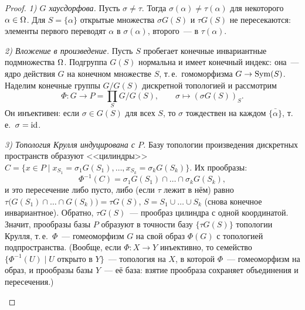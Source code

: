 \begin{proof}
\emph{1) $G$ хаусдорфова.} Пусть $\sigma\ne\tau$. Тогда $\sigma(\alpha)\ne\tau(\alpha)$ для некоторого $\alpha\in\Omega$. Для
$S=\{\alpha\}$ открытые множества $\sigma G(S)$ и $\tau G(S)$ не пересекаются: элементы первого переводят $\alpha$ в
$\sigma(\alpha)$, второго~--- в $\tau(\alpha)$.

\emph{2) Вложение в произведение.} Пусть $S$ пробегает конечные инвариантные подмножества $\Omega$. Подгруппа $G(S)$
нормальна и имеет конечный индекс: она~--- ядро действия $G$ на конечном множестве $S$, т.\,е.\ гомоморфизма
$G\to\operatorname{Sym}(S)$. Наделим конечные группы $G/G(S)$ дискретной топологией и рассмотрим
\[
\Phi\colon G\to P=\prod_S G/G(S),\qquad \sigma\mapsto(\sigma G(S))_S.
\]
Он инъективен: если $\sigma\in G(S)$ для всех $S$, то $\sigma$ тождествен на каждом $\bar{\{\alpha\}}$, т.\,е.\
$\sigma=\operatorname{id}$.

\emph{3) Топология Крулля индуцирована с $P$.} Базу топологии произведения дискретных пространств образуют
<<цилиндры>> $C=\{x\in P\mid x_{S_1}=\sigma_1G(S_1),\dots,x_{S_k}=\sigma_kG(S_k)\}$. Их прообразы:
\[
\Phi^{-1}(C)=\sigma_1G(S_1)\cap\dots\cap\sigma_kG(S_k),
\]
и это пересечение либо пусто, либо (если $\tau$ лежит в нём) равно $\tau\bigl(G(S_1)\cap\dots\cap G(S_k)\bigr)=\tau G(S)$,
$S=S_1\cup\dots\cup S_k$ (снова конечное инвариантное). Обратно, $\tau G(S)$~--- прообраз цилиндра с одной координатой.
Значит, прообразы базы $P$ образуют в точности базу $\{\tau G(S)\}$ топологии Крулля, т.\,е.\ $\Phi$~--- гомеоморфизм
$G$ на свой образ $\Phi(G)$ с топологией подпространства. (Вообще, если $\Phi\colon X\to Y$ инъективно, то семейство
$\{\Phi^{-1}(U)\mid U\text{ открыто в }Y\}$~--- топология на $X$, в которой $\Phi$~--- гомеоморфизм на образ, и прообразы
базы $Y$~--- её база: взятие прообраза сохраняет объединения и пересечения.)

\begin{center}
\end{center}


\end{proof}
